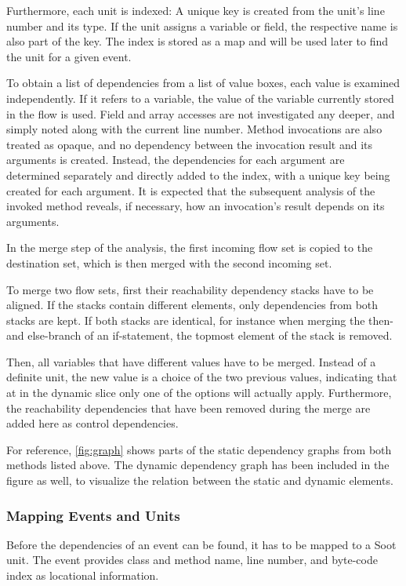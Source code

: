 \documentclass[english]{scrartcl}
\begin{document}
Furthermore, each unit is indexed:
A unique key is created from the unit's line number and its type. 
If the unit assigns a variable or field, the respective name is also part of the key.
The index is stored as a map and will be used later to find the unit for a given event.

To obtain a list of dependencies from a list of value boxes, each value is examined independently.
If it refers to a variable, the value of the variable currently stored in the flow is used.
Field and array accesses are not investigated any deeper, and simply noted along with the current line number.
Method invocations are also treated as opaque, and no dependency between the invocation result and its arguments is created.
Instead, the dependencies for each argument are determined separately and directly added to the index, with a unique key being created for each argument.
It is expected that the subsequent analysis of the invoked method reveals, if necessary, how an invocation's result depends on its arguments.

In the merge step of the analysis, the first incoming flow set is copied to the destination set, which is then merged with the second incoming set.

To merge two flow sets, first their reachability dependency stacks have to be aligned.
If the stacks contain different elements, only dependencies from both stacks are kept.
If both stacks are identical, for instance when merging the then- and else-branch of an if-statement, the topmost element of the stack is removed.

Then, all variables that have different values have to be merged.
Instead of a definite unit, the new value is a choice of the two previous values, indicating that at in the dynamic slice only one of the options will actually apply.
Furthermore, the reachability dependencies that have been removed during the merge are added here as control dependencies.

For reference, \autoref{fig:graph} shows parts of the static dependency graphs from both methods listed above.
The dynamic dependency graph has been included in the figure as well, to visualize the relation between the static and dynamic elements.

\subsubsection{Mapping Events and Units}

Before the dependencies of an event can be found, it has to be mapped to a Soot unit.
The event provides class and method name, line number, and byte-code index as locational information.
\end{document}
